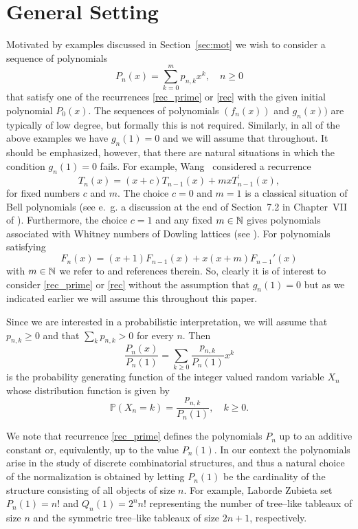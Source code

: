 \documentclass[10pt]{amsart}
\numberwithin{subcase}{case}
\begin{document}
\section{General Setting}
Motivated by  examples discussed in Section~\ref{sec:mot} we wish to consider a sequence of polynomials  \[P_n(x)=\sum_{k=0}^mp_{n,k}x^k,\quad n\ge0\]  
that satisfy one of the  recurrences \eqref{rec_prime} or \eqref{rec}
 with the given initial polynomial $P_0(x)$. The sequences of polynomials $(f_n(x))$ and $g_n(x))$ are typically of low degree, but formally this is not required. Similarly, 
in all of the above examples we have  $g_n(1)=0$ and we will assume that throughout. It should be emphasized, however, that there are natural situations in which the condition $g_n(1)=0$ fails. For example, Wang~\cite{W} considered a recurrence
\[T_n(x)=(x+c)T_{n-1}(x)+mxT^{'}_{n-1}(x),\]
for fixed numbers $c$ and $m$. The choice $c=0$ and $m=1$ is a classical situation of Bell polynomials (see e.~g. a discussion at the end of Section~7.2 in Chapter~VII of \cite{C}). Furthermore, the choice $c=1$ and any fixed  $m\in \Bbb N$ gives polynomials associated with Whitney numbers of Dowling lattices (see \cite{Be2}). For polynomials satisfying
\[F_n(x)=(x+1)F_{n-1}(x)+x(x+m)F_{n-1}'(x)\]
with $m\in\Bbb N$ we refer to \cite[Section~4]{Be1} and references therein. So, clearly it is of interest to consider \eqref{rec_prime} or \eqref{rec} without the assumption that $g_n(1)=0$ but as we indicated earlier we will assume this throughout this paper. 

Since we are interested in a probabilistic interpretation, we will assume that $p_{n,k}\ge0$ and that 
$\sum_kp_{n,k}>0$ for every $n$. Then
\[\frac{P_n(x)}{P_n(1)}=\sum_{k\ge0}\frac{p_{n,k}}{P_n(1)}x^k\]
is the probability generating function of the integer valued random variable $X_n$ whose distribution function is given  by 
\begin{equation}\label{rv}{\mathbb{P}}(X_n=k)=\frac{p_{n,k}}{P_n(1)},\quad k\ge0.\end{equation}

We note that  recurrence \eqref{rec_prime} defines the polynomials $P_n$ up to an additive constant or, equivalently, up to the value $P_n(1)$. In our context the polynomials  arise in the study of discrete combinatorial structures, and thus a natural choice of  the normalization is obtained by letting $P_n(1)$ be the cardinality of the structure consisting of all objects of size $n$. For example, Laborde Zubieta set $P_n(1)=n!$ and $Q_n(1)=2^nn!$ representing the number of tree--like tableaux of size $n$ and the symmetric tree--like tableaux of size $2n+1$, respectively.   
\end{document}
